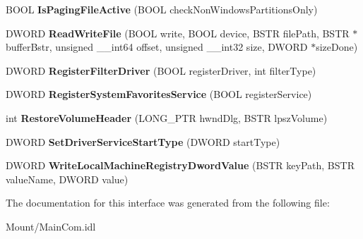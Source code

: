 \begin{DoxyCompactItemize}
B\+O\+OL {\bfseries Is\+Paging\+File\+Active} (B\+O\+OL check\+Non\+Windows\+Partitions\+Only)
\item 
\mbox{\label{interface_gost_crypt_main_com_1_1_i_gost_crypt_main_com_aa8dd2e3b86d1099728a98dbd0f4f7337}} 
D\+W\+O\+RD {\bfseries Read\+Write\+File} (B\+O\+OL write, B\+O\+OL device, B\+S\+TR file\+Path, B\+S\+TR $\ast$buffer\+Bstr, unsigned \+\_\+\+\_\+int64 offset, unsigned \+\_\+\+\_\+int32 size, D\+W\+O\+RD $\ast$size\+Done)
\item 
\mbox{\label{interface_gost_crypt_main_com_1_1_i_gost_crypt_main_com_aef6b990600572e6e9d8d4d670fd69237}} 
D\+W\+O\+RD {\bfseries Register\+Filter\+Driver} (B\+O\+OL register\+Driver, int filter\+Type)
\item 
\mbox{\label{interface_gost_crypt_main_com_1_1_i_gost_crypt_main_com_a2341bbac1c7c6921ba6cd9476520e26b}} 
D\+W\+O\+RD {\bfseries Register\+System\+Favorites\+Service} (B\+O\+OL register\+Service)
\item 
\mbox{\label{interface_gost_crypt_main_com_1_1_i_gost_crypt_main_com_a5f1eb50ec15ef9cc594feab5ad9e9e2a}} 
int {\bfseries Restore\+Volume\+Header} (L\+O\+N\+G\+\_\+\+P\+TR hwnd\+Dlg, B\+S\+TR lpsz\+Volume)
\item 
\mbox{\label{interface_gost_crypt_main_com_1_1_i_gost_crypt_main_com_af2796a411fd2288f2dbb0e5a86698720}} 
D\+W\+O\+RD {\bfseries Set\+Driver\+Service\+Start\+Type} (D\+W\+O\+RD start\+Type)
\item 
\mbox{\label{interface_gost_crypt_main_com_1_1_i_gost_crypt_main_com_a06e0bbe7e7d199c9eb8e08dff0d36a36}} 
D\+W\+O\+RD {\bfseries Write\+Local\+Machine\+Registry\+Dword\+Value} (B\+S\+TR key\+Path, B\+S\+TR value\+Name, D\+W\+O\+RD value)
\end{DoxyCompactItemize}


The documentation for this interface was generated from the following file\+:\begin{DoxyCompactItemize}
\item 
Mount/Main\+Com.\+idl\end{DoxyCompactItemize}
